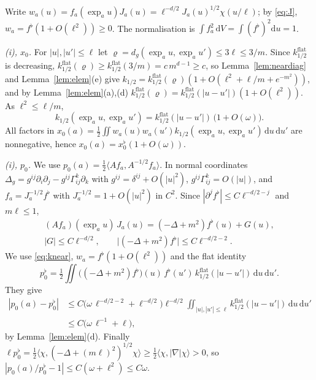 \documentclass[11pt,a4paper]{article}
\makeatletter
\theoremstyle{stmt}
\theoremstyle{defn}
\theoremstyle{rmk}
\renewenvironment{proof}[1][\proofname]{\par\pushQED{\qed}\normalfont\topsep6\p@\@plus6\p@\relax
  \trivlist\item[\hskip\labelsep{\sffamily\itshape\small #1.}]\ignorespaces}{\popQED\endtrivlist\@endpefalse}
\numberwithin{equation}{section}
\newcommand{\dd}{\mathrm{d}}
\makeatother
\begin{document}
\begin{proof}[Proof of Proposition~\ref{prop:modes}]
Write $w_a(u)=f_a(\exp_au)J_a(u)=\ell^{-d/2}J_a(u)^{1/2}\chi(u/\ell)$; by \eqref{eq:J}, $w_a=f^\flat(1+O(\ell^2))\ge0$. The normalisation is $\int f_a^2\,\dd V=\int(f^\flat)^2\dd u=1$.

\emph{(i), $x_0$.} For $|u|,|u'|\le\ell$ let $\varrho=d_g(\exp_au,\exp_au')\le3\ell\le3/m$. Since $k^{\mathrm{flat}}_{1/2}$ is decreasing, $k^{\mathrm{flat}}_{1/2}(\varrho)\ge k^{\mathrm{flat}}_{1/2}(3/m)=c\,m^{d-1}\ge c$, so Lemma~\ref{lem:neardiag} and Lemma~\ref{lem:elem}(e) give $k_{1/2}=k^{\mathrm{flat}}_{1/2}(\varrho)(1+O(\ell^2+\ell/m+e^{-m^2}))$, and by Lemma~\ref{lem:elem}(a),(d) $k^{\mathrm{flat}}_{1/2}(\varrho)=k^{\mathrm{flat}}_{1/2}(|u-u'|)(1+O(\ell^2))$. As $\ell^2\le\ell/m$,
\begin{equation}\label{eq:knear}
k_{1/2}(\exp_au,\exp_au')=k^{\mathrm{flat}}_{1/2}(|u-u'|)\,\big(1+O(\omega)\big).
\end{equation}
All factors in $x_0(a)=\tfrac12\iint w_a(u)w_a(u')k_{1/2}(\exp_au,\exp_au')\,\dd u\,\dd u'$ are nonnegative, hence $x_0(a)=x_0^\flat(1+O(\omega))$.

\emph{(i), $p_0$.} We use $p_0(a)=\tfrac12\langle Af_a,A^{-1/2}f_a\rangle$. In normal coordinates $\Delta_g=g^{ij}\partial_i\partial_j-g^{ij}\Gamma^k_{ij}\partial_k$ with $g^{ij}=\delta^{ij}+O(|u|^2)$, $g^{ij}\Gamma^k_{ij}=O(|u|)$, and $f_a=J_a^{-1/2}f^\flat$ with $J_a^{-1/2}=1+O(|u|^2)$ in $C^2$. Since $|\partial^jf^\flat|\le C\ell^{-d/2-j}$ and $m\ell\le1$,
\begin{gather*}
(Af_a)(\exp_au)\,J_a(u)=(-\Delta+m^2)f^\flat(u)+G(u),\\
|G|\le C\ell^{-d/2},\qquad\big|(-\Delta+m^2)f^\flat\big|\le C\ell^{-d/2-2}.
\end{gather*}
We use \eqref{eq:knear}, $w_a=f^\flat(1+O(\ell^2))$ and the flat identity
\[
p_0^\flat=\tfrac12\iint\big((-\Delta+m^2)f^\flat\big)(u)\,f^\flat(u')\,k^{\mathrm{flat}}_{1/2}(|u-u'|)\,\dd u\,\dd u' .
\]
They give
\begin{align*}
|p_0(a)-p_0^\flat|&\le C\big(\omega\,\ell^{-d/2-2}+\ell^{-d/2}\big)\ell^{-d/2}\iint_{|u|,|u'|\le\ell}k^{\mathrm{flat}}_{1/2}(|u-u'|)\,\dd u\,\dd u'\\
&\le C\big(\omega\,\ell^{-1}+\ell\big),
\end{align*}
by Lemma~\ref{lem:elem}(d). Finally $\ell p_0^\flat=\tfrac12\langle\chi,(-\Delta+(m\ell)^2)^{1/2}\chi\rangle\ge\tfrac12\langle\chi,|\nabla|\chi\rangle>0$, so $|p_0(a)/p_0^\flat-1|\le C(\omega+\ell^2)\le C\omega$.


\end{proof}
\end{document}
